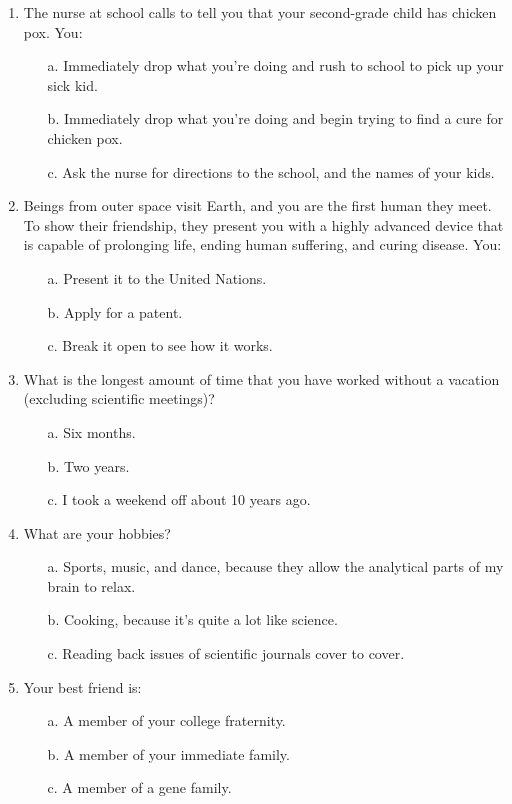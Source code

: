 \begin{enumerate}
	\item The nurse at school calls to tell you that your second-grade child has chicken pox. You: 
	\begin{enumerate}
		\item[a.]  Immediately drop what you're doing and rush to school to pick up your sick kid. 
		\item[b.] Immediately drop what you're doing and begin trying to find a cure for chicken pox.
		\item[c.]  Ask the nurse for directions to the school, and the names of your kids.
	\end{enumerate}

	\item Beings from outer space visit Earth, and you are the first human they meet. To show their friendship, they present you with a highly advanced device that is capable of prolonging life, ending human suffering, and curing disease. You: 
	\begin{enumerate}
		\item[a.] Present it to the United Nations.
		\item[b.] Apply for a patent.
		\item[c.] Break it open to see how it works.
	\end{enumerate}

	\item What is the longest amount of time that you have worked without a vacation (excluding scientific meetings)? 
	\begin{enumerate}
		\item[a.] Six months.
		\item[b.] Two years.
		\item[c.] I took a weekend off about 10 years ago.
	\end{enumerate}

	\item What are your hobbies? 
	\begin{enumerate}
		\item[a.] Sports, music, and dance, because they allow the analytical parts of my brain to relax.
		\item[b.] Cooking, because it's quite a lot like science.
		\item[c.] Reading back issues of scientific journals cover to cover. 
	\end{enumerate}

	\item Your best friend is: 
	\begin{enumerate}
		\item[a.] A member of your college fraternity.
		\item[b.] A member of your immediate family.
		\item[c.] A member of a gene family.
	\end{enumerate}
\end{enumerate}

